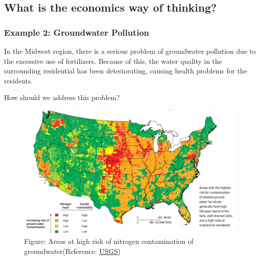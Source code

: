 \documentclass[
  letterpaper,
  DIV=11,
  numbers=noendperiod]{scrartcl}
\begin{document}
\subsection{What is the economics way of
thinking?}\label{what-is-the-economics-way-of-thinking-1}

\subsubsection{Example 2: Groundwater
Pollution}\label{example-2-groundwater-pollution}

In the Midwest region, there is a serious problem of groundwater
pollution due to the excessive use of fertilizers. Because of this, the
water quality in the surrounding residential has been deteriorating,
causing health problems for the residents.

{How should we address this problem?}

\begin{figure}[H]

{\centering \includegraphics{lab1_files/mediabag/wss-nitrogen-map-us-.jpg}

}

\caption{Figure: Areas at high risk of nitrogen contamination of
groundwater(Reference:
\href{https://www.usgs.gov/media/images/areas-high-risk-nitrogen-contamination-groundwater}{USGS})}

\end{figure}%
\end{document}
